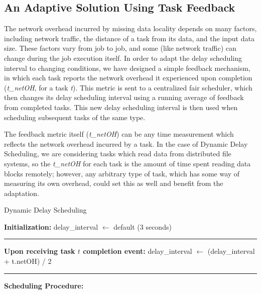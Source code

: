 \subsection{An Adaptive Solution Using Task Feedback}

The network overhead incurred by missing data locality depends on many factors, including 
network traffic, the distance of a task from its data, and the input data size. These 
factors vary from job to job, and some (like network traffic) can change during the job 
execution itself. In order to adapt the delay scheduling interval to changing conditions, 
we have designed a simple feedback mechanism, in which each task reports the network overhead it experienced 
upon completion (\textit{t\_netOH}, for a task \textit{t}). This metric is sent to a 
centralized fair scheduler, which then changes its delay scheduling interval using a 
running average of feedback from completed tasks. This new delay scheduling interval is 
then used when scheduling subsequent tasks of the same type.

The feedback metric itself (\textit{t\_netOH}) can be any time measurement which 
reflects the network overhead incurred by a task. In the case of Dynamic Delay Scheduling, we are 
considering tasks which read data from distributed file systems,
so the \textit{t\_netOH} for each task is the amount of time spent 
reading data blocks remotely; however, any arbitrary type of task, which has some way of 
measuring its own overhead, could set this as well and benefit from the adaptation.


\begin{algorithm}[]
    \footnotesize
    \DontPrintSemicolon
    \caption{Dynamic Delay Scheduling}
    \textbf{Initialization:}\;
    delay\_interval $\leftarrow$ default (3 seconds)\;
    \hrule width 0.4\textwidth
    \;
    \textbf{Upon receiving task $t$ completion event:}\;
    delay\_interval $\leftarrow$ (delay\_interval + t.netOH) / 2\;
    \hrule width 0.4\textwidth
    \;
    \textbf{Scheduling Procedure:}\;
\end{algorithm}



